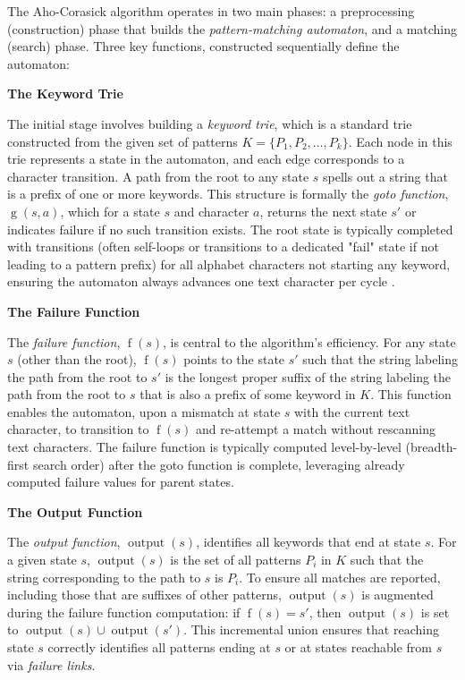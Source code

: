 
The Aho-Corasick algorithm operates in two main phases: a preprocessing (construction) phase that builds the \textit{pattern-matching automaton}, and a matching (search) phase. Three key functions, constructed sequentially define the automaton:

\textbf{The Keyword Trie}

The initial stage involves building a \textit{keyword trie}, which is a standard trie constructed from the given set of patterns $K = \{P_1, P_2, \dots, P_k\}$. Each node in this trie represents a state in the automaton, and each edge corresponds to a character transition. A path from the root to any state $s$ spells out a string that is a prefix of one or more keywords. This structure is formally the \textit{goto function}, $\operatorname{g}(s, a)$, which for a state $s$ and character $a$, returns the next state $s'$ or indicates failure if no such transition exists. The root state is typically completed with transitions (often self-loops or transitions to a dedicated "fail" state if not leading to a pattern prefix) for all alphabet characters not starting any keyword, ensuring the automaton always advances one text character per cycle \cite{AhoCorasick1975, SedgewickWayne2011}.

\textbf{The Failure Function}

The \textit{failure function}, $\operatorname{f}(s)$, is central to the algorithm's efficiency. For any state $s$ (other than the root), $\operatorname{f}(s)$ points to the state $s'$ such that the string labeling the path from the root to $s'$ is the longest proper suffix of the string labeling the path from the root to $s$ that is also a prefix of some keyword in $K$. This function enables the automaton, upon a mismatch at state $s$ with the current text character, to transition to $\operatorname{f}(s)$ and re-attempt a match without rescanning text characters. The failure function is typically computed level-by-level (breadth-first search order) after the goto function is complete, leveraging already computed failure values for parent states.

\textbf{The Output Function}

The \textit{output function}, $\operatorname{output}(s)$, identifies all keywords that end at state $s$. For a given state $s$, $\operatorname{output}(s)$ is the set of all patterns $P_i$ in $K$ such that the string corresponding to the path to $s$ is $P_i$. To ensure all matches are reported, including those that are suffixes of other patterns, $\operatorname{output}(s)$ is augmented during the failure function computation: if $\operatorname{f}(s) = s'$, then $\operatorname{output}(s)$ is set to $\operatorname{output}(s) \cup \operatorname{output}(s')$. This incremental union ensures that reaching state $s$ correctly identifies all patterns ending at $s$ or at states reachable from $s$ via \textit{failure links}.

